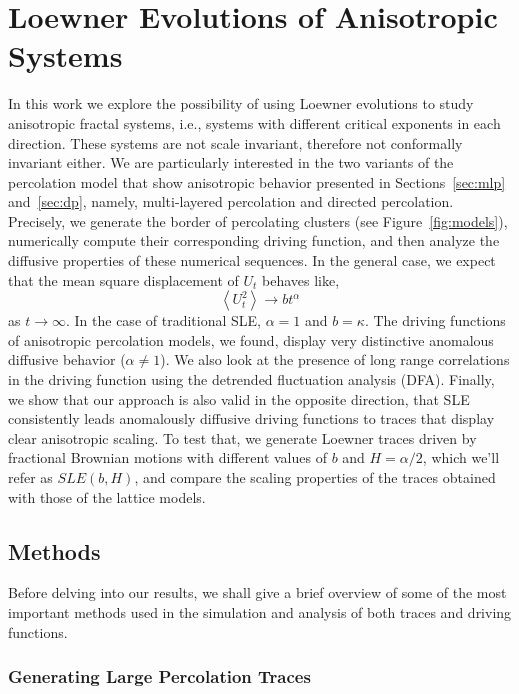 \chapter{Loewner Evolutions of Anisotropic Systems}
\label{ch:asle}

In this work we explore the possibility of using Loewner evolutions to study
anisotropic fractal systems, i.e., systems with different critical exponents in
each direction. These systems are not scale invariant, therefore not
conformally invariant either. We are particularly interested in the two
variants of the percolation model that show anisotropic behavior presented in
Sections~\ref{sec:mlp} and~\ref{sec:dp}, namely, multi-layered percolation and
directed percolation. Precisely, we generate the border of percolating
clusters (see Figure~\ref{fig:models}), numerically compute their corresponding
driving function, and then analyze the diffusive properties of these numerical
sequences. In the general case, we expect that the mean square displacement of
$U_t$ behaves like,
\begin{equation}
    \label{eq:diff}
    \left\langle U_t^2 \right\rangle \rightarrow b t^\alpha
\end{equation} 
as $t\rightarrow\infty$. In the case of traditional SLE, $\alpha=1$ and
$b=\kappa$.  The driving functions of anisotropic percolation models, we found,
display very distinctive anomalous diffusive behavior ($\alpha\neq1$). We also
look at the presence of long range correlations in the driving function using
the detrended fluctuation analysis (DFA). Finally, we show that our approach is
also valid in the opposite direction, that SLE consistently leads
anomalously diffusive driving functions to traces that display clear
anisotropic scaling. To test that, we generate Loewner traces driven by
fractional Brownian motions with different values of $b$ and $H=\alpha/2$,
which we'll refer as $SLE(b,H)$, and compare the scaling properties of the
traces obtained with those of the lattice models.


\section{Methods}
\label{sec:methods}

Before delving into our results, we shall give a brief overview of some of the
most important methods used in the simulation and analysis of both traces
and driving functions.

\subsection{Generating Large Percolation Traces}
\label{sec:hulls}

